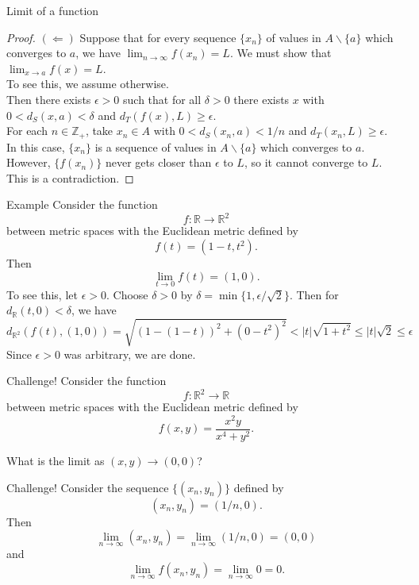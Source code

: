 \documentclass{beamer}
\begin{document}
\begin{frame}{Limit of a function}
\begin{proof}
$(\Leftarrow)$\quad
Suppose that for every sequence $\{x_n\}$ of values in $A\backslash\{a\}$ which converges to $a$, we have $\lim_{n\rightarrow \infty} f(x_n) = L$.
\pause
We must show that $\lim_{x\rightarrow a} f(x) = L$.\\
\pause
To see this, we assume otherwise.\\
\pause
Then there exists $\epsilon > 0$ such that for all $\delta > 0$ there exists $x$ with $0 < d_S(x,a) < \delta$ and $d_T(f(x),L) \geq \epsilon$.\\
\pause
For each $n\in \mathbb{Z}_+$, take $x_n\in A$ with $0 < d_S(x_n,a) < 1/n$ and $d_T(x_n,L) \geq \epsilon$.\\
\pause
In this case, $\{x_n\}$ is a sequence of values in $A\backslash\{a\}$ which converges to $a$.\\
\pause
However, $\{f(x_n)\}$ never gets closer than $\epsilon$ to $L$, so it cannot converge to $L$.\\
\pause
This is a contradiction.
\end{proof}
\end{frame}

\begin{frame}{Example}
Consider the function
$$f: \mathbb{R}\rightarrow \mathbb R^2$$
between metric spaces with the Euclidean metric defined by
$$f(t) = (1-t,t^2).$$
\pause
Then
$$\lim_{t\rightarrow 0} f(t) = (1,0).$$
\pause
To see this, let $\epsilon > 0$.
\pause
Choose $\delta > 0$ by $\delta = \min\{1,\epsilon/\sqrt{2}\}$.
\pause
Then for $d_{\mathbb{R}}(t,0) < \delta$, we have
\pause
{\small
$$d_{\mathbb{R}^2}(f(t),(1,0)) = \sqrt{(1-(1-t))^2 + (0-t^2)^2} < |t|\sqrt{1+t^2} \leq |t|\sqrt{2} \leq \epsilon$$
}
\pause
Since $\epsilon > 0$ was arbitrary, we are done.
\end{frame}

\begin{frame}{Challenge!}
Consider the function
$$f: \mathbb{R}^2\rightarrow \mathbb R$$
between metric spaces with the Euclidean metric defined by
$$f(x,y) = \frac{x^2y}{x^4+y^2}.$$
\pause
\begin{quest}
\pause
What is the limit as $(x,y)\rightarrow (0,0)$?
\end{quest}
\end{frame}

\begin{frame}{Challenge!}
Consider the sequence $\{(x_n,y_n)\}$ defined by
$$(x_n,y_n) = (1/n,0).$$
\pause
Then
$$\lim_{n\rightarrow \infty} (x_n,y_n) = \lim_{n\rightarrow \infty} (1/n,0) = (0,0)$$
\pause
and
$$\lim_{n\rightarrow \infty} f(x_n,y_n) = \lim_{n\rightarrow \infty} 0 = 0.$$
\end{frame}
\end{document}
